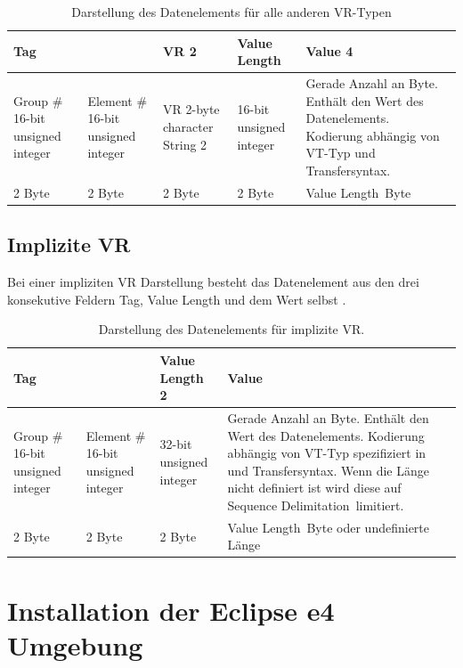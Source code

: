 \begin{table}
	\begin{tabularx}{\textwidth}{|X|X|X|X|p{12cm}|}
	\toprule \hline
	\multicolumn{2}{|l|}{\textbf{Tag}} & \textbf{VR} 2 & \textbf{Value Length} & \textbf{Value} 4 \\ \hline
	Group \# 16-bit unsigned integer & Element \# 16-bit unsigned integer & VR 2-byte character String 2 & 16-bit unsigned integer & Gerade Anzahl an Byte. Enthält den Wert des Datenelements. Kodierung abhängig von VT-Typ und Transfersyntax. \\ \hline
	2 Byte & 2 Byte & 2 Byte & 2 Byte & \glqq Value Length\grqq\ Byte \\ \hline
	\bottomrule
	\end{tabularx}
    \caption {Darstellung des Datenelements für alle anderen VR-Typen}
    \label{table:appendix_explizit_else}
\end{table}

\section{Implizite VR}

Bei einer impliziten VR Darstellung besteht das Datenelement aus den drei konsekutive Feldern Tag, Value Length und dem Wert selbst \cite[7.1.3]{dicom:structure}.

\begin{table}
	\begin{tabularx}{\textwidth}{|X|X|X|p{12cm}|}
	\toprule \hline
	\multicolumn{2}{|l|}{\textbf{Tag}} & \textbf{Value Length} 2 & \textbf{Value} \\ \hline
	Group \# 16-bit unsigned integer & Element \# 16-bit unsigned integer & 32-bit unsigned integer & Gerade Anzahl an Byte. Enthält den Wert des Datenelements. Kodierung abhängig von VT-Typ spezifiziert in \cite{dicom:dd} und Transfersyntax. Wenn die Länge nicht definiert ist wird diese auf \glqq Sequence Delimitation\grqq\ limitiert. \\ \hline
	2 Byte & 2 Byte & 2 Byte & \glqq Value Length\grqq\ Byte oder undefinierte Länge \\ \hline
	
	\bottomrule
	
	\end{tabularx}
    \caption {Darstellung des Datenelements für implizite VR.}
    \label{table:appendix_implizit}
\end{table}


\chapter{Installation der Eclipse e4 Umgebung}

